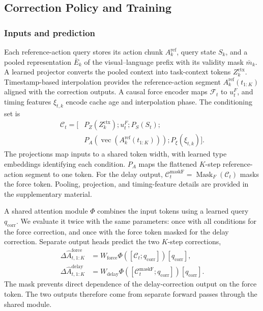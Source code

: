 \subsection{Correction Policy and Training}
\label{sec:residual_policy}

\subsubsection{Inputs and prediction}
Each reference-action query stores its action chunk $A_k^{\mathrm{ref}}$, query state $S_k$, and a pooled representation $\bar E_k$ of the visual--language prefix with its validity mask $\bar m_k$. A learned projector converts the pooled context into task-context tokens $Z_k^{\mathrm{ctx}}$. Timestamp-based interpolation provides the reference-action segment $A_k^{\mathrm{ref}}(t_{1:K})$ aligned with the correction outputs. A causal force encoder maps $\mathcal F_t$ to $u_t^F$, and timing features $\xi_{t,k}$ encode cache age and interpolation phase. The conditioning set is
\begin{align}
    \mathcal C_t=[&P_Z(Z_k^{\mathrm{ctx}});u_t^F;P_S(S_t);
    \nonumber\\[-2pt]
    &P_A(\operatorname{vec}(A_k^{\mathrm{ref}}(t_{1:K})));P_\xi(\xi_{t,k})].
    \label{eq:conditioning_set}
\end{align}
The projections map inputs to a shared token width, with learned type embeddings identifying each condition. $P_A$ maps the flattened $K$-step reference-action segment to one token. For the delay output, $\mathcal C_t^{\mathrm{maskF}}=\operatorname{Mask}_F(\mathcal C_t)$ masks the force token. Pooling, projection, and timing-feature details are provided in the supplementary material.

A shared attention module $\Phi$ combines the input tokens using a learned query $q_{\mathrm{corr}}$. We evaluate it twice with the same parameters: once with all conditions for the force correction, and once with the force token masked for the delay correction. Separate output heads predict the two $K$-step corrections,
\begin{align}
    \Delta\hat A^{\mathrm{force}}_{t,1:K}
    &=W_{\mathrm{force}}\Phi([\mathcal C_t;q_{\mathrm{corr}}])[q_{\mathrm{corr}}],
    \label{eq:force_output}\\
    \Delta\hat A^{\mathrm{delay}}_{t,1:K}
    &=W_{\mathrm{delay}}
      \Phi([\mathcal C_t^{\mathrm{maskF}};q_{\mathrm{corr}}])[q_{\mathrm{corr}}].
    \label{eq:delay_output}
\end{align}
The mask prevents direct dependence of the delay-correction output on the force token. The two outputs therefore come from separate forward passes through the shared module.

